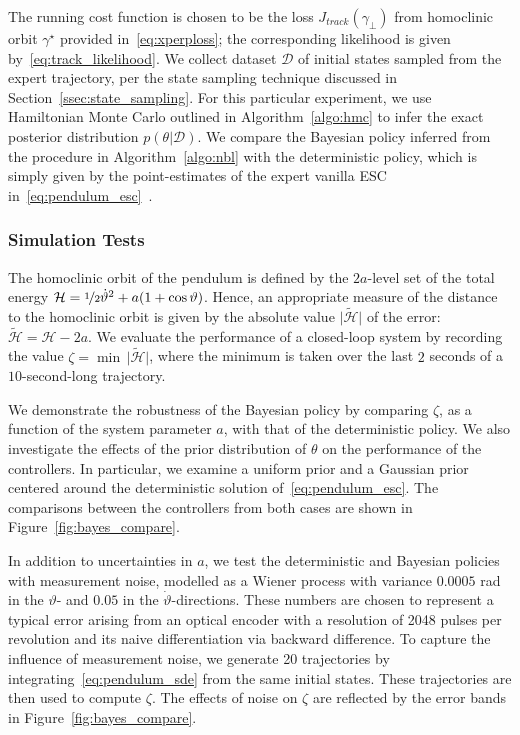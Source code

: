 The running cost function is chosen to be the loss $J_{track}(\gamma_\bot)$
from homoclinic orbit $\gamma^\star$ provided in~\eqref{eq:xperploss}; the
corresponding likelihood is given by~\eqref{eq:track_likelihood}. We collect
dataset $\mathcal{D}$ of initial states sampled from the expert trajectory,
per the state sampling technique discussed in
Section~\ref{ssec:state_sampling}. For this particular experiment, we use
Hamiltonian Monte Carlo outlined in Algorithm~\ref{algo:hmc} to infer the
exact posterior distribution $p(\theta | \mathcal{D})$. We compare the
Bayesian policy inferred from the procedure in Algorithm~\ref{algo:nbl} with
the deterministic policy, which is simply given by the point-estimates of
the expert vanilla ESC in~\eqref{eq:pendulum_esc}~\cite{acc}.

\subsubsection{Simulation Tests} 
The homoclinic orbit of the pendulum is defined by the $2a$-level set of the
total energy $\mathcal{H} = \nicefrac{1}{2}\dot{\vartheta}^2 + a(1 +
\cos{\vartheta})$. Hence, an appropriate measure of the distance to the
homoclinic orbit is given by the absolute value $\bigl| \mathcal{\tilde{H}}
\bigr|$ of the error: $\mathcal{\tilde{H}} = \mathcal{H} - 2a$. We evaluate the
performance of a closed-loop system by recording the value $\zeta = \min \,
\bigl| \mathcal{\tilde{H}} \bigr|$, where the minimum is taken over the last $2$
seconds of a $10$-second-long trajectory.


We demonstrate the robustness of the Bayesian policy by comparing $\zeta$,
as a function of the system parameter $a$, with that of the deterministic
policy.
%
We also investigate the effects of the prior distribution of $\theta$ on the
performance of the controllers.
%
In particular, we examine a uniform prior and a Gaussian prior centered around
the deterministic solution of~\eqref{eq:pendulum_esc}.
%
The comparisons between the controllers from both cases are shown in
Figure~\ref{fig:bayes_compare}.
%

In addition to uncertainties in $a$, we test the deterministic and Bayesian
policies with measurement noise, modelled as a Wiener process with variance
$0.0005$ \unit{rad} in the $\vartheta$- and $0.05$  in the
$\dot{\vartheta}$-directions.
%
These numbers are chosen to represent a typical error arising from an
optical encoder with a resolution of 2048 pulses per revolution and its naive
differentiation via backward difference.
%
To capture the influence of measurement noise, we generate 20 trajectories
by integrating~\eqref{eq:pendulum_sde} from the same initial states. 
%
These trajectories are then used to compute $\zeta$. 
%
The effects of noise on $\zeta$ are reflected by the error bands in
Figure~\ref{fig:bayes_compare}.

